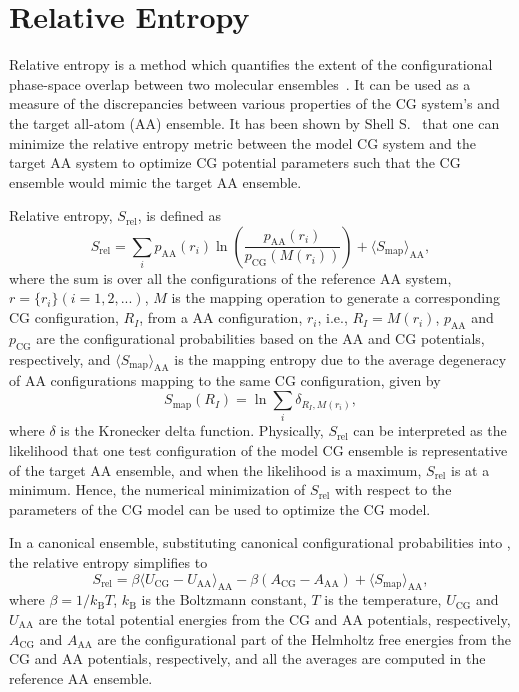 \section{Relative Entropy}
\label{sec:re}

Relative entropy is a method which quantifies the extent of the configurational
phase-space overlap between two molecular ensembles~\cite{Wu2005}. It can be
used as a measure of the discrepancies between various properties of the CG
system's and the target all-atom (AA) ensemble. It has been shown by Shell
S.~\cite{Shell2008} that one can minimize the relative entropy metric between
the model CG system and the target AA system to optimize CG potential parameters
such that the CG ensemble would mimic the target AA ensemble.

Relative entropy, $S_{\text{rel}}$, is defined as \cite{Shell2008}
\begin{equation}
\label{eq:srel}
S_{\text{rel}} = \sum_{i}p_{\text{AA}}(r_i) \ln\left(
  \frac{p_{\text{AA}}(r_i)}{p_{\text{CG}}\left(M(r_i)\right)}\right) +
\langle S_{\text{map}} \rangle_{\text{AA}},
\end{equation}
where the sum is over all the configurations of the reference AA system,
$r=\{r_i\} (i=1,2,...)$, $M$ is the mapping operation to generate a
corresponding CG configuration, $R_I$, from a AA configuration, $r_i$, i.e.,
$R_I = M(r_i)$, $p_\text{AA}$ and $p_\text{CG}$ are the configurational
probabilities based on the AA and CG potentials, respectively, and $ \langle
S_{\text{map}}\rangle_{\text{AA}}$ is the mapping entropy due to the average
degeneracy of AA configurations mapping to the same CG configuration, given by
\begin{equation}
\label{eq:smap}
S_{\text{map}}(R_I)=\ln\sum_{i}\delta_{R_I,M(r_i)} ,
\end{equation}
where $\delta$ is the Kronecker delta function. Physically, $S_{\text{rel}}$ can
be interpreted as the likelihood that one test configuration of the model CG
ensemble is representative of the target AA ensemble, and when the likelihood is
a maximum, $S_{\text{rel}}$ is at a minimum. Hence, the numerical minimization
of $S_{\text{rel}}$ with respect to the parameters of the CG model can be used
to optimize the CG model.

In a canonical ensemble, substituting canonical configurational probabilities
into , the relative entropy simplifies to
\begin{equation}
\label{eq:srelcan}
S_{\text{rel}}=\beta\langle U_{\text{CG}} - U_{\text{AA}}\rangle_{\text{AA}}
- \beta\left( A_{\text{CG}} - A_{\text{AA}}\right)
+ \langle S_{\text{map}}\rangle_{\text{AA}} ,
\end{equation}
where $\beta={1}/{k_{\text{B}}T}$, $k_{\text{B}}$ is the Boltzmann constant, $T$
is the temperature, $U_\text{CG}$ and $U_\text{AA}$ are the total potential
energies from the CG and AA potentials, respectively, $A_\text{CG}$ and
$A_\text{AA}$ are the configurational part of the Helmholtz free energies from
the CG and AA potentials, respectively, and all the averages are computed in the
reference AA ensemble.

